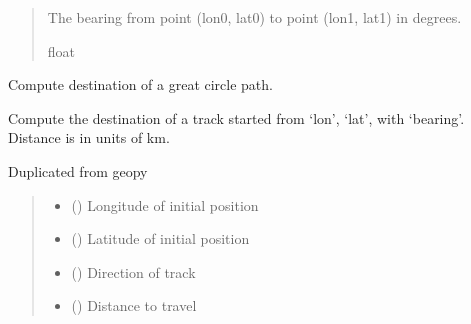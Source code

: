 \documentclass[letterpaper,10pt,english]{sphinxmanual}
\begin{document}
\begin{fulllineitems}
\begin{quote}
\begin{description}
\begin{itemize}
\end{itemize}

\sphinxAtStartPar
{} \textendash{} The bearing from point (lon0, lat0) to point (lon1, lat1) in degrees.

\sphinxAtStartPar
float

\end{description}\end{quote}

\end{fulllineitems}


\begin{fulllineitems}
\label{\detokenize{users_guide:geotrees.distance_metrics.destination}}
\pysigstartsignatures
\pysiglinewithargsret
{}
{\sphinxparamcomma {}\sphinxparamcomma {}\sphinxparamcomma {}}
{}
\pysigstopsignatures
\sphinxAtStartPar
Compute destination of a great circle path.

\sphinxAtStartPar
Compute the destination of a track started from ‘lon’, ‘lat’, with
‘bearing’. Distance is in units of km.

\sphinxAtStartPar
Duplicated from geo\sphinxhyphen{}py
\begin{quote}\begin{description}
\begin{itemize}
\item {}
\sphinxAtStartPar
{} () \textendash{} Longitude of initial position

\item {}
\sphinxAtStartPar
{} () \textendash{} Latitude of initial position

\item {}
\sphinxAtStartPar
{} () \textendash{} Direction of track

\item {}
\sphinxAtStartPar
{} () \textendash{} Distance to travel


\end{itemize}
\end{description}
\end{quote}
\end{fulllineitems}
\end{document}
